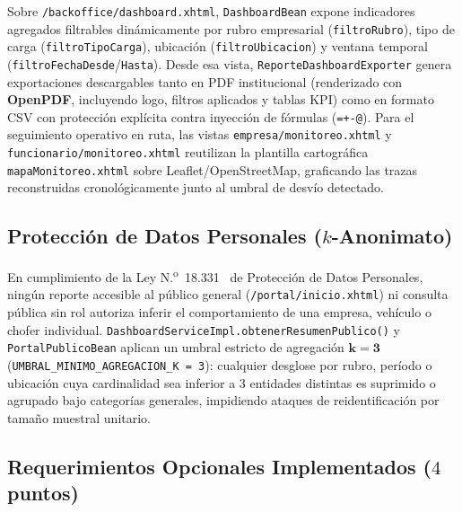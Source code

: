 \documentclass[11pt,a4paper,twocolumn]{article}
\begin{document}
Sobre \texttt{/backoffice/dashboard.xhtml}, \texttt{DashboardBean} expone indicadores agregados filtrables dinámicamente por rubro empresarial (\texttt{filtroRubro}), tipo de carga (\texttt{filtroTipoCarga}), ubicación (\texttt{filtroUbicacion}) y ventana temporal (\texttt{filtroFechaDesde}/\texttt{Hasta}). Desde esa vista, \texttt{ReporteDashboardExporter} genera exportaciones descargables tanto en PDF institucional (renderizado con \textbf{OpenPDF}, incluyendo logo, filtros aplicados y tablas KPI) como en formato CSV con protección explícita contra inyección de fórmulas (\texttt{=+-@}). Para el seguimiento operativo en ruta, las vistas \texttt{empresa/monitoreo.xhtml} y \texttt{funcionario/monitoreo.xhtml} reutilizan la plantilla cartográfica \texttt{mapaMonitoreo.xhtml} sobre Leaflet/OpenStreetMap, graficando las trazas reconstruidas cronológicamente junto al umbral de desvío detectado.

\subsection{Protección de Datos Personales (\texorpdfstring{$k$}{k}-Anonimato)}

En cumplimiento de la Ley N.\textsuperscript{o}~18.331~\cite{ley18331} de Protección de Datos Personales, ningún reporte accesible al público general (\texttt{/portal/inicio.xhtml}) ni consulta pública sin rol autoriza inferir el comportamiento de una empresa, vehículo o chofer individual. \texttt{DashboardServiceImpl.obtenerResumenPublico()} y \texttt{PortalPublicoBean} aplican un umbral estricto de agregación $\mathbf{k = 3}$ (\texttt{UMBRAL\_MINIMO\_AGREGACION\_K = 3}): cualquier desglose por rubro, período o ubicación cuya cardinalidad sea inferior a $3$ entidades distintas es suprimido o agrupado bajo categorías generales, impidiendo ataques de reidentificación por tamaño muestral unitario.

\subsection{Requerimientos Opcionales Implementados (\texorpdfstring{$4$}{4} puntos)}
\end{document}
